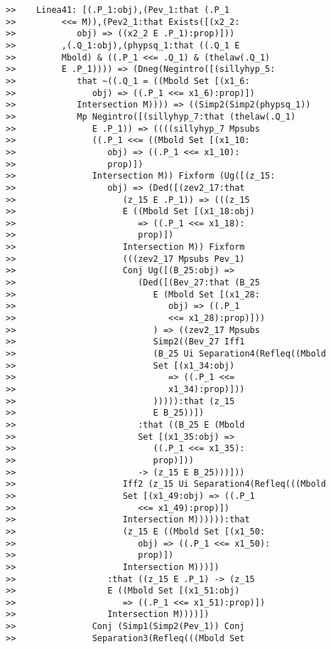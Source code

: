 \documentclass[12pt]{article}
\begin{document}
\begin{verbatim}
>>    Linea41: [(.P_1:obj),(Pev_1:that (.P_1
>>         <<= M)),(Pev2_1:that Exists([(x2_2:
>>            obj) => ((x2_2 E .P_1):prop)]))
>>         ,(.Q_1:obj),(phypsq_1:that ((.Q_1 E
>>         Mbold) & ((.P_1 <<= .Q_1) & (thelaw(.Q_1)
>>         E .P_1)))) => (Dneg(Negintro([(sillyhyp_5:
>>            that ~((.Q_1 = ((Mbold Set [(x1_6:
>>               obj) => ((.P_1 <<= x1_6):prop)])
>>            Intersection M)))) => ((Simp2(Simp2(phypsq_1))
>>            Mp Negintro([(sillyhyp_7:that (thelaw(.Q_1)
>>               E .P_1)) => ((((sillyhyp_7 Mpsubs
>>               ((.P_1 <<= ((Mbold Set [(x1_10:
>>                  obj) => ((.P_1 <<= x1_10):
>>                  prop)])
>>               Intersection M)) Fixform (Ug([(z_15:
>>                  obj) => (Ded([(zev2_17:that
>>                     (z_15 E .P_1)) => (((z_15
>>                     E ((Mbold Set [(x1_18:obj)
>>                        => ((.P_1 <<= x1_18):
>>                        prop)])
>>                     Intersection M)) Fixform
>>                     (((zev2_17 Mpsubs Pev_1)
>>                     Conj Ug([(B_25:obj) =>
>>                        (Ded([(Bev_27:that (B_25
>>                           E (Mbold Set [(x1_28:
>>                              obj) => ((.P_1
>>                              <<= x1_28):prop)]))
>>                           ) => ((zev2_17 Mpsubs
>>                           Simp2((Bev_27 Iff1
>>                           (B_25 Ui Separation4(Refleq((Mbold
>>                           Set [(x1_34:obj)
>>                              => ((.P_1 <<=
>>                              x1_34):prop)]))
>>                           ))))):that (z_15
>>                           E B_25))])
>>                        :that ((B_25 E (Mbold
>>                        Set [(x1_35:obj) =>
>>                           ((.P_1 <<= x1_35):
>>                           prop)]))
>>                        -> (z_15 E B_25)))]))
>>                     Iff2 (z_15 Ui Separation4(Refleq(((Mbold
>>                     Set [(x1_49:obj) => ((.P_1
>>                        <<= x1_49):prop)])
>>                     Intersection M)))))):that
>>                     (z_15 E ((Mbold Set [(x1_50:
>>                        obj) => ((.P_1 <<= x1_50):
>>                        prop)])
>>                     Intersection M)))])
>>                  :that ((z_15 E .P_1) -> (z_15
>>                  E ((Mbold Set [(x1_51:obj)
>>                     => ((.P_1 <<= x1_51):prop)])
>>                  Intersection M))))])
>>               Conj (Simp1(Simp2(Pev_1)) Conj
>>               Separation3(Refleq(((Mbold Set

\end{verbatim}
\end{document}
